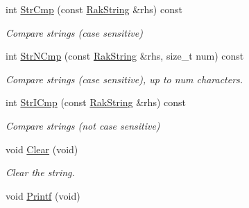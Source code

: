 \begin{DoxyCompactItemize}
\item 
\hypertarget{class_rak_net_1_1_rak_string_a84e1217c6ce0ac078c4f8d915d6affd4}{int \hyperlink{class_rak_net_1_1_rak_string_a84e1217c6ce0ac078c4f8d915d6affd4}{Str\-Cmp} (const \hyperlink{class_rak_net_1_1_rak_string}{Rak\-String} \&rhs) const }\label{class_rak_net_1_1_rak_string_a84e1217c6ce0ac078c4f8d915d6affd4}

\begin{DoxyCompactList}\small\item\em Compare strings (case sensitive) \end{DoxyCompactList}\item 
\hypertarget{class_rak_net_1_1_rak_string_a396827d39e9c9d759042af0f3db91a57}{int \hyperlink{class_rak_net_1_1_rak_string_a396827d39e9c9d759042af0f3db91a57}{Str\-N\-Cmp} (const \hyperlink{class_rak_net_1_1_rak_string}{Rak\-String} \&rhs, size\-\_\-t num) const }\label{class_rak_net_1_1_rak_string_a396827d39e9c9d759042af0f3db91a57}

\begin{DoxyCompactList}\small\item\em Compare strings (case sensitive), up to num characters. \end{DoxyCompactList}\item 
\hypertarget{class_rak_net_1_1_rak_string_a3d140fcc50a7c3d77dc3374d41b3224c}{int \hyperlink{class_rak_net_1_1_rak_string_a3d140fcc50a7c3d77dc3374d41b3224c}{Str\-I\-Cmp} (const \hyperlink{class_rak_net_1_1_rak_string}{Rak\-String} \&rhs) const }\label{class_rak_net_1_1_rak_string_a3d140fcc50a7c3d77dc3374d41b3224c}

\begin{DoxyCompactList}\small\item\em Compare strings (not case sensitive) \end{DoxyCompactList}\item 
\hypertarget{class_rak_net_1_1_rak_string_a079ab758f03449e52c4a4f7b5303bba8}{void \hyperlink{class_rak_net_1_1_rak_string_a079ab758f03449e52c4a4f7b5303bba8}{Clear} (void)}\label{class_rak_net_1_1_rak_string_a079ab758f03449e52c4a4f7b5303bba8}

\begin{DoxyCompactList}\small\item\em Clear the string. \end{DoxyCompactList}\item 
\hypertarget{class_rak_net_1_1_rak_string_ae856fde4a0c06c92e1b6358ee2f416d9}{void \hyperlink{class_rak_net_1_1_rak_string_ae856fde4a0c06c92e1b6358ee2f416d9}{Printf} (void)}\label{class_rak_net_1_1_rak_string_ae856fde4a0c06c92e1b6358ee2f416d9}


\end{DoxyCompactItemize}

